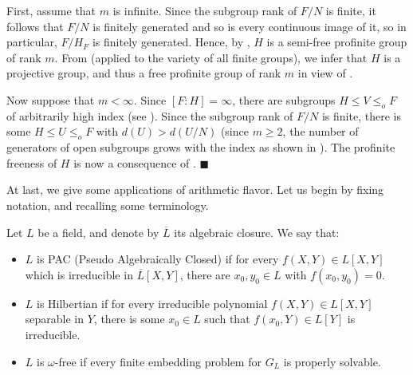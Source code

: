 \documentclass[12pt,a4paper]{article}
\newenvironment{proof}[1][Proof]{\begin{trivlist}
\item[\hskip \labelsep {\bfseries #1}]}{\end{trivlist}}
\newenvironment{definition}[1][Definition]{\begin{trivlist}
\item[\hskip \labelsep {\bfseries #1}]}{\end{trivlist}}
\begin{document}
\begin{proof}

First, assume that $m$ is infinite. Since the subgroup rank of $F/N$ is finite, it follows that $F/N$ is finitely generated and so is every continuous image of it, so in particular, $F/H_F$ is finitely generated. Hence, by \cite[Main Theorem II]{BHH}, $H$ is a semi-free profinite group of rank $m$. From \cite[Lemma 7.6.3 (b)]{RZ} (applied to the variety of all finite groups), we infer that $H$ is a projective group, and thus a free profinite group of rank $m$ in view of \cite[Theorem 3.6]{BHH}.

Now suppose that $m < \infty$. Since $[F : H] = \infty$, there are subgroups $H \leq V \leq_o F$ of arbitrarily high index (see \cite[Proposition 2.3.2 (b)]{RZ}). Since the subgroup rank of $F/N$ is finite, there is some $H \leq U \leq_o F$ with $d(U) > d(U/N)$ (since $m \geq 2$, the number of generators of open subgroups grows with the index as shown in \cite[Theorem 3.6.2 (b)]{RZ}). The profinite freeness of $H$ is now a consequence of \mbox{\cite[Lemma 1.2]{Ja06}}. $\blacksquare$ 

\end{proof}

At last, we give some applications of arithmetic flavor. Let us begin by fixing notation, and recalling some terminology. 

\begin{definition} \label{Hildef}

Let $L$ be a field, and denote by $\overline{L}$ its algebraic closure. We say that:

\begin{itemize}

\item $L$ is PAC (Pseudo Algebraically Closed) if for every \mbox{$f(X,Y) \in L[X,Y]$} which is irreducible in $\overline{L}[X,Y]$, there are $x_0,y_0 \in L$ with \mbox{$f(x_0,y_0) = 0$}.

\item $L$ is Hilbertian if for every irreducible polynomial \mbox{$f(X,Y) \in L[X,Y]$} separable in $Y$, there is some $x_0 \in L$ such that \mbox{$f(x_0,Y) \in L[Y]$} is irreducible.

\item $L$ is $\omega$-free if every finite embedding problem for $G_L$ is properly solvable.

\end{itemize}

\end{definition}
\end{document}

